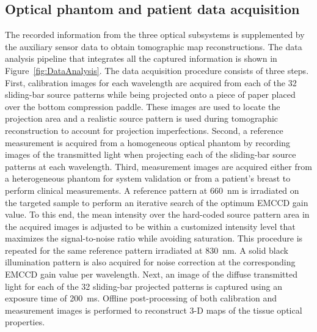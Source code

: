 \subsection{Optical phantom and patient data acquisition}
\label{Sec:DataAcquisition}
The recorded information from the three optical subsystems is supplemented by the auxiliary sensor data to obtain tomographic map reconstructions. The data analysis pipeline that integrates all the captured information is shown in Figure~\ref{fig:DataAnalysis}. The data acquisition procedure consists of three steps. First, calibration images for each wavelength are acquired from each of the 32 sliding-bar source patterns while being projected onto a piece of paper placed over the bottom compression paddle. These images are used to locate the projection area and a realistic source pattern is used during tomographic reconstruction to account for projection imperfections. Second, a reference measurement is acquired from a homogeneous optical phantom by recording images of the transmitted light when projecting each of the sliding-bar source patterns at each wavelength. Third, measurement images are acquired either from a heterogeneous phantom for system validation or from a patient's breast to perform clinical measurements. A reference pattern at 660~nm is irradiated on the targeted sample to perform an iterative search of the optimum EMCCD gain value. To this end, the mean intensity over the hard-coded source pattern area in the acquired images is adjusted to be within a customized intensity level that maximizes the signal-to-noise ratio while avoiding saturation. This procedure is repeated for the same reference pattern irradiated at 830~nm. A solid black illumination pattern is also acquired for noise correction at the corresponding EMCCD gain value per wavelength. Next, an image of the diffuse transmitted light for each of the 32 sliding-bar projected patterns is captured using an exposure time of 200~ms. Offline post-processing of both calibration and measurement images is performed to reconstruct 3-D maps of the tissue optical properties.

